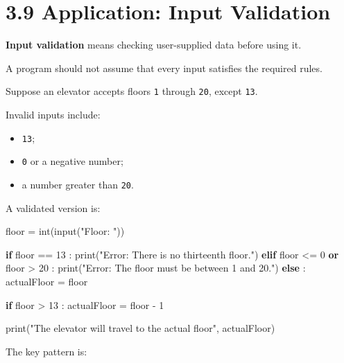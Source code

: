 \documentclass[
  11pt,
  a4paper,
]{article}
\newenvironment{Shaded}{}{}
\newcommand{\BuiltInTok}[1]{\textcolor[rgb]{0.00,0.50,0.00}{#1}}
\newcommand{\ControlFlowTok}[1]{\textcolor[rgb]{0.00,0.44,0.13}{\textbf{#1}}}
\newcommand{\DecValTok}[1]{\textcolor[rgb]{0.25,0.63,0.44}{#1}}
\newcommand{\KeywordTok}[1]{\textcolor[rgb]{0.00,0.44,0.13}{\textbf{#1}}}
\newcommand{\NormalTok}[1]{#1}
\newcommand{\OperatorTok}[1]{\textcolor[rgb]{0.40,0.40,0.40}{#1}}
\newcommand{\StringTok}[1]{\textcolor[rgb]{0.25,0.44,0.63}{#1}}
\providecommand{\tightlist}{%
  \setlength{\itemsep}{0pt}\setlength{\parskip}{0pt}}
\begin{document}
\section{3.9 Application: Input
Validation}\label{application-input-validation}

\textbf{Input validation} means checking user-supplied data before using
it.

A program should not assume that every input satisfies the required
rules.

Suppose an elevator accepts floors \texttt{1} through \texttt{20},
except \texttt{13}.

Invalid inputs include:

\begin{itemize}
\tightlist
\item
  \texttt{13};
\item
  \texttt{0} or a negative number;
\item
  a number greater than \texttt{20}.
\end{itemize}

A validated version is:

\begin{Shaded}
\begin{Highlighting}[]
\NormalTok{floor }\OperatorTok{=} \BuiltInTok{int}\NormalTok{(}\BuiltInTok{input}\NormalTok{(}\StringTok{"Floor: "}\NormalTok{))}

\ControlFlowTok{if}\NormalTok{ floor }\OperatorTok{==} \DecValTok{13}\NormalTok{ :}
    \BuiltInTok{print}\NormalTok{(}\StringTok{"Error: There is no thirteenth floor."}\NormalTok{)}
\ControlFlowTok{elif}\NormalTok{ floor }\OperatorTok{\textless{}=} \DecValTok{0} \KeywordTok{or}\NormalTok{ floor }\OperatorTok{\textgreater{}} \DecValTok{20}\NormalTok{ :}
    \BuiltInTok{print}\NormalTok{(}\StringTok{"Error: The floor must be between 1 and 20."}\NormalTok{)}
\ControlFlowTok{else}\NormalTok{ :}
\NormalTok{    actualFloor }\OperatorTok{=}\NormalTok{ floor}

    \ControlFlowTok{if}\NormalTok{ floor }\OperatorTok{\textgreater{}} \DecValTok{13}\NormalTok{ :}
\NormalTok{        actualFloor }\OperatorTok{=}\NormalTok{ floor }\OperatorTok{{-}} \DecValTok{1}

    \BuiltInTok{print}\NormalTok{(}\StringTok{"The elevator will travel to the actual floor"}\NormalTok{, actualFloor)}
\end{Highlighting}
\end{Shaded}

The key pattern is:
\end{document}
